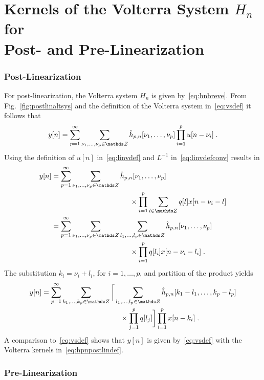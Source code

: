 \documentclass[10pt,twocolumn,twoside]{IEEEtran}
\begin{document}
\section{Kernels of the Volterra System $H_n$ for\\ Post- and Pre-Linearization}
	\label{linkernels}

\subsubsection{Post-Linearization}

For post-linearization, the Volterra system $H_n$ is given by~\eqref{eq:hnbreve}.
From Fig.~\ref{fig:postlinaltsys} and the definition of the Volterra system
in~\eqref{eq:vsdef} it follows that
\begin{align*}
	y[n]
		= \sum_{p=1}^\infty \sum_{\nu_1,\dots,\nu_p\in\Z} \hat{h}_{p,n}[\nu_1,\dots,\nu_p]\prod_{i=1}^p u[n-\nu_i]\;.
\end{align*}
Using the definition of $u[n]$ in~\eqref{eq:linvdef} and $L^{-1}$ in~\eqref{eq:linvdefconv}
results in
\begin{align*}
	y[n]
		&= \sum_{p=1}^\infty \sum_{\nu_1,\dots,\nu_p\in\Z} \hat{h}_{p,n}[\nu_1,\dots,\nu_p] \\
				&\qquad\qquad\qquad\qquad\qquad\quad\times
				\prod_{i=1}^p \sum_{l\in\Z} q[l] x[n-\nu_i-l] \\
		&= \sum_{p=1}^\infty \sum_{\nu_1,\dots,\nu_p\in\Z} \sum_{l_1,\dots,l_p\in\Z}
				\hat{h}_{p,n}[\nu_1,\dots,\nu_p] \\
				&\qquad\qquad\qquad\qquad\qquad\quad\times
				\prod_{i=1}^p q[l_i] x[n-\nu_i-l_i]\;.
\end{align*}
The substitution $k_i=\nu_i+l_i$, for $i=1,\ldots,p$, and
partition of the product yields
\begin{align*}
	y[n]
		&= \sum_{p=1}^\infty \sum_{k_1,\dots,k_p\in\Z} \bigg[
				\sum_{l_1,\dots,l_p\in\Z}  \hat{h}_{p,n}[k_1-l_1,\dots,k_p-l_p] \\
				&\qquad\qquad\qquad\qquad\qquad\quad\times
				\prod_{j=1}^p q[l_j] \bigg] \prod_{i=1}^p x[n-k_i]\;.
\end{align*}
A comparison to~\eqref{eq:vsdef} shows that $y[n]$ is given by~\eqref{eq:vsdef}
with the Volterra kernels in~\eqref{eq:hpnpostlindef}.


\subsubsection{Pre-Linearization}
\end{document}
